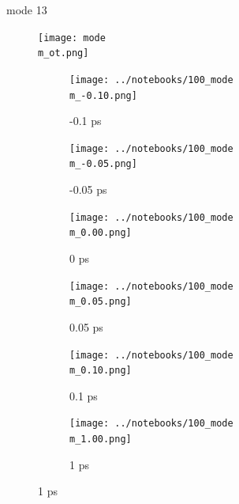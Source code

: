 \documentclass{beamer}
\newcommand\w{0.32}
\begin{document}
\renewcommand\m{13}
\begin{frame}{mode \m}
		\vspace{\vh mm}
	\begin{figure}
		\centering
		\texttt{[image: mode\\m\_ot.png]}
	\end{figure}
	\begin{figure}
		\centering
		\begin{subfigure}[b]{\w\textwidth}
			\centering
			\texttt{[image: ../notebooks/100\_mode\\m\_-0.10.png]}
			\caption{-0.1 ps}
		\end{subfigure}
		\begin{subfigure}[b]{\w\textwidth}
			\centering
			\texttt{[image: ../notebooks/100\_mode\\m\_-0.05.png]}
			\caption{-0.05 ps}
		\end{subfigure}
		\begin{subfigure}[b]{\w\textwidth}
			\centering
			\texttt{[image: ../notebooks/100\_mode\\m\_0.00.png]}
			\caption{0 ps}
		\end{subfigure}
		\begin{subfigure}[b]{\w\textwidth}
			\centering
			\texttt{[image: ../notebooks/100\_mode\\m\_0.05.png]}
			\caption{0.05 ps}
		\end{subfigure}
		\begin{subfigure}[b]{\w\textwidth}
			\centering
			\texttt{[image: ../notebooks/100\_mode\\m\_0.10.png]}
			\caption{0.1 ps}
		\end{subfigure}
		\begin{subfigure}[b]{\w\textwidth}
			\centering
			\texttt{[image: ../notebooks/100\_mode\\m\_1.00.png]}
			\caption{1 ps}
		\end{subfigure}
	\end{figure}
\end{frame}
\end{document}
